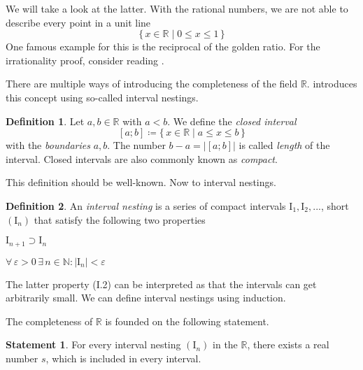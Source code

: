 \documentclass[a4paper, 10pt]{article}
\theoremstyle{definition}
\newtheorem*{statement}{Statement}
\theoremstyle{definition}
\newtheorem*{definition}{Definition}
\begin{document}
    We will take a look at the latter. With the rational numbers, we are not able to describe every point in a unit line
    \[
        \{\,x \in \mathbb{R} \mid 0 \leq x \leq 1 \,\}
    \]
    One famous example for this is the reciprocal of the golden ratio. For the irrationality proof, consider reading \cite{analysiskoenigsberger}.

    There are multiple ways of introducing the completeness of the field \(\mathbb{R}\). \cite{analysiskoenigsberger} introduces this concept using so-called interval nestings.

    \begin{definition}
        Let \(a, b \in \mathbb{R}\) with \(a < b\). We define the \emph{closed interval}
        \[
            [a; b] \coloneqq \{\, x \in \mathbb{R} \mid a \leq x \leq b \,\}
        \]
        with the \emph{boundaries} \(a, b\). The number \(b - a = |[a; b]|\) is called \emph{length} of the interval. Closed intervals are also commonly known as \emph{compact}.
    \end{definition}

    This definition should be well-known. Now to interval nestings.

    \newcommand{\intv}{\text{I}}
    \begin{definition}
        An \emph{interval nesting} is a series of compact intervals \(\intv_1, \intv_2, ...\), short \((\intv_n)\) that satisfy the following two properties

        \item[\hspace{0.5cm}(I.1)] \(\intv_{n+1} \supset \intv_n\)
        
        \item[\hspace{0.5cm}(I.2)] \(\forall \, \varepsilon > 0 \, \exists \, n \in \mathbb{N}\colon |\intv_n| < \varepsilon\)
    \end{definition}

    The latter property (I.2) can be interpreted as that the intervals can get arbitrarily small. We can define interval nestings using induction.

    The completeness of \(\mathbb{R}\) is founded on the following statement.

    \begin{mdframed}[innertopmargin=0]
        \begin{statement}
            For every interval nesting \((\intv_n)\) in the \(\mathbb{R}\), there exists a real number \(s\), which is included in every interval.
        \end{statement}
    \end{mdframed}
\end{document}
